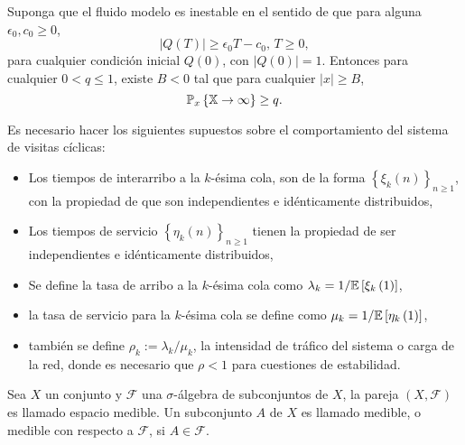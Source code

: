 \begin{Teo}\label{Tma2.2.Down}
Suponga que el fluido modelo es inestable en el sentido de que
para alguna $\epsilon_{0},c_{0}\geq0$,
\begin{equation}\label{Eq.Inestability}
|Q\left(T\right)|\geq\epsilon_{0}T-c_{0}\textrm{,   }T\geq0,
\end{equation}
para cualquier condici\'on inicial $Q\left(0\right)$, con
$|Q\left(0\right)|=1$. Entonces para cualquier $0<q\leq1$, existe
$B<0$ tal que para cualquier $|x|\geq B$,
\begin{equation}
\mathbb{P}_{x}\left\{\mathbb{X}\rightarrow\infty\right\}\geq q.
\end{equation}
\end{Teo}



Es necesario hacer los siguientes supuestos sobre el
comportamiento del sistema de visitas c\'iclicas:
\begin{itemize}
\item Los tiempos de interarribo a la $k$-\'esima cola, son de la
forma $\left\{\xi_{k}\left(n\right)\right\}_{n\geq1}$, con la
propiedad de que son independientes e id{\'e}nticamente
distribuidos,
\item Los tiempos de servicio
$\left\{\eta_{k}\left(n\right)\right\}_{n\geq1}$ tienen la
propiedad de ser independientes e id{\'e}nticamente distribuidos,
\item Se define la tasa de arribo a la $k$-{\'e}sima cola como
$\lambda_{k}=1/\mathbb{E}\left[\xi_{k}\left(1\right)\right]$,
\item la tasa de servicio para la $k$-{\'e}sima cola se define
como $\mu_{k}=1/\mathbb{E}\left[\eta_{k}\left(1\right)\right]$,
\item tambi{\'e}n se define $\rho_{k}:=\lambda_{k}/\mu_{k}$, la
intensidad de tr\'afico del sistema o carga de la red, donde es
necesario que $\rho<1$ para cuestiones de estabilidad.
\end{itemize}

\begin{Def}
Sea $X$ un conjunto y $\mathcal{F}$ una $\sigma$-\'algebra de
subconjuntos de $X$, la pareja $\left(X,\mathcal{F}\right)$ es
llamado espacio medible. Un subconjunto $A$ de $X$ es llamado
medible, o medible con respecto a $\mathcal{F}$, si
$A\in\mathcal{F}$.
\end{Def}

